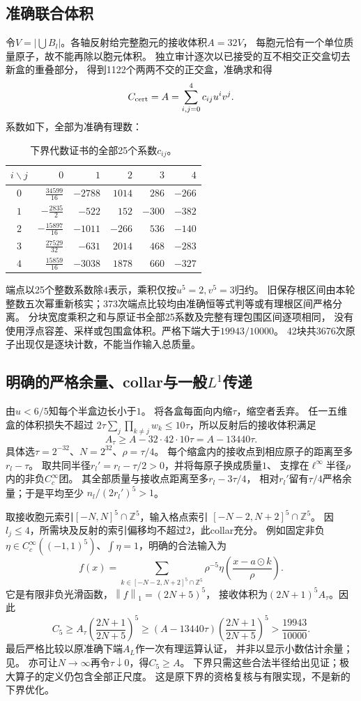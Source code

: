 \documentclass[UTF8,fontset=fandol,zihao=-4,a4paper]{ctexart}
\newcommand{\1}{\mathbf 1}
\newcommand{\norm}[1]{\left\lVert#1\right\rVert}
\begin{document}
\subsection{准确联合体积}
令$V=|\bigcup B_l|$。各轴反射给完整胞元的接收体积$A=32V$，
每胞元恰有一个单位质量原子，故不能再除以胞元体积。
独立审计逐次以已接受的互不相交正交盒切去新盒的重叠部分，
得到1122个两两不交的正交盒，准确求和得
\[
 C_{\rm cert}=A=\sum_{i,j=0}^4c_{ij}u^iv^j.
\]
系数如下，全部为准确有理数：
\begin{table}[ht]\centering\small
\begin{tabular}{c|rrrrr}
\toprule $i\backslash j$&$0$&$1$&$2$&$3$&$4$\\\midrule
$0$&$\frac{34599}{16}$&$-2788$&$1014$&$286$&$-266$\\
$1$&$-\frac{2835}{2}$&$-522$&$152$&$-300$&$-382$\\
$2$&$-\frac{15897}{16}$&$-1011$&$-266$&$536$&$-140$\\
$3$&$\frac{27529}{32}$&$-631$&$2014$&$468$&$-283$\\
$4$&$\frac{15859}{16}$&$-3038$&$1878$&$660$&$-327$\\
\bottomrule\end{tabular}
\caption{下界代数证书的全部25个系数$c_{ij}$。}\label{tab:lowercoeff}
\end{table}
端点以25个整数系数除$4$表示，乘积仅按$u^5=2,v^5=3$归约。
旧保存根区间由本轮整数五次幂重新核实；373次端点比较均由准确恒等式判等或有理根区间严格分离。
分块宽度乘积之和与原证书全部25系数及完整有理包围区间逐项相同，
没有使用浮点容差、采样或包围盒体积。严格下端大于$19943/10000$。
42块共3676次原子出现仅是逐块计数，不能当作输入总质量。

\subsection{明确的严格余量、collar与一般$L^1$传递}
由$u<6/5$知每个半盒边长小于$1$。
将各盒每面向内缩$\tau$，缩空者丢弃。
任一五维盒的体积损失不超过
$2\tau\sum_j\prod_{k\ne j}w_k\le10\tau$，所以反射后的接收体积满足
\[
 A_\tau\ge A-32\cdot42\cdot10\tau=A-13440\tau.
\]
具体选$\tau=2^{-32}$、$N=2^{32}$、$\rho=\tau/4$。
每个缩盒内的接收点到相应原子的距离至多$r_l-\tau$。
取共同半径$r_l'=r_l-\tau/2>0$，并将每原子换成质量$1$、
支撑在$\ell^\infty$半径$\rho$内的非负$C_c^\infty$团。
其全部质量与接收点距离至多$r_l-3\tau/4$，
相对$r_l'$留有$\tau/4$严格余量；于是平均至少
$n_l/(2r_l')^5>1$。

取接收胞元索引$[-N,N]^5\cap\mathbb Z^5$，输入格点索引
$[-N-2,N+2]^5\cap\mathbb Z^5$。
因$l_j\le4$，所需块及反射的索引偏移均不超过$2$，此collar充分。
例如固定非负$\eta\in C_c^\infty((-1,1)^5)$、$\int\eta=1$，明确的合法输入为
\[
 f(x)=\sum_{k\in[-N-2,N+2]^5\cap\mathbb Z^5}
       \rho^{-5}\eta\!\left(\frac{x-a\odot k}{\rho}\right).
\]
它是有限非负光滑函数，$\norm f_1=(2N+5)^5$，
接收体积为$(2N+1)^5A_\tau$。因此
\[
 C_5\ge A_\tau\left(\frac{2N+1}{2N+5}\right)^5
 \ge(A-13440\tau)\left(\frac{2N+1}{2N+5}\right)^5
 >\frac{19943}{10000}.
\]
最后严格比较以原准确下端$A_L$作一次有理运算认证，
并非以显示小数估计余量；见。
亦可让$N\to\infty$再令$\tau\downarrow0$，得$C_5\ge A$。
下界只需这些合法半径给出见证；极大算子的定义仍包含全部正尺度。
这是原下界的资格复核与有限实现，不是新的下界优化。
\end{document}
